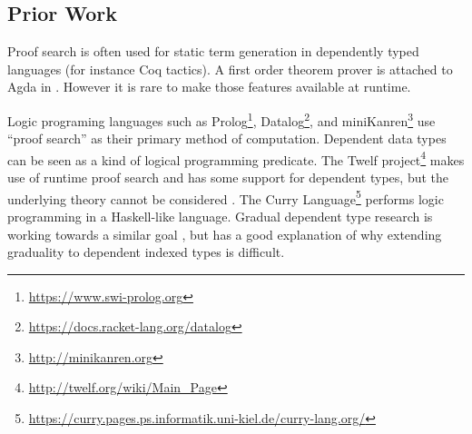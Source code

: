 \subsection{Prior Work}

Proof search is often used for static term generation in dependently typed languages (for instance Coq tactics).
A first order theorem prover is attached to Agda in \cite{norell2007towards}.
However it is rare to make those features available at runtime. 

Logic programing languages such as Prolog\footnote{\url{https://www.swi-prolog.org}}, Datalog\footnote{\url{https://docs.racket-lang.org/datalog}}, and miniKanren\footnote{\url{http://minikanren.org}} use ``proof search'' as their primary method of computation.
Dependent data types can be seen as a kind of logical programming predicate.
The Twelf project\footnote{\url{http://twelf.org/wiki/Main\_Page}} makes use of runtime proof search and has some support for dependent types, but the underlying theory cannot be considered \fullSp{}.
The Curry Language\footnote{\url{https://curry.pages.ps.informatik.uni-kiel.de/curry-lang.org/}} performs logic programming in a Haskell-like language.
Gradual dependent type research is working towards a similar goal \cite{DBLP:journals/corr/abs-1906-06469}, but \cite{bertrand:hal-02896776} has a good explanation of why extending graduality to dependent indexed types is difficult.

